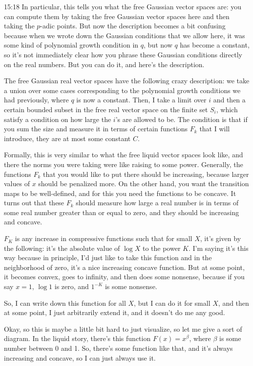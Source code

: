 \begin{unfinished}{15:18}
In particular, this tells you what the free Gaussian vector spaces are: you can compute them by taking the free Gaussian vector spaces here and then taking the
$p$-adic points. But now the description becomes a bit confusing because when we wrote down the Gaussian conditions that we allow here, it was some kind of polynomial growth condition in $q$, but now $q$ has become a constant, so it's not immediately clear how you phrase these Gaussian conditions directly on the real numbers. But you can do it, and here's the description.

The free Gaussian real vector spaces have the following crazy description: we take a union over some cases corresponding to the polynomial growth conditions we had previously, where $q$ is now a constant. Then, I take a limit over $i$ and then a certain bounded subset in the free real vector space on the finite set $S_i$, which satisfy a condition on how large the $i$'s are allowed to be. The condition is that if you sum the size and measure it in terms of certain functions $F_k$ that I will introduce, they are at most some constant $C$.

Formally, this is very similar to what the free liquid vector spaces look like, and there the norms you were taking were like raising to some power. Generally, the functions $F_k$ that you would like to put there should be increasing, because larger values of $x$ should be penalized more. On the other hand, you want the transition maps to be well-defined, and for this you need the functions to be concave. It turns out that these $F_k$ should measure how large a real number is in terms of some real number greater than or equal to zero, and they should be increasing and concave.


$F_K$ is any increase in compressive functions such that for small $X$, it's given by the following: it's the absolute value of $\log X$ to the power $K$. I'm saying it's this way because in principle, I'd just like to take this function and in the neighborhood of zero, it's a nice increasing concave function. But at some point, it becomes convex, goes to infinity, and then does some nonsense, because if you say $x = 1$, $\log 1$ is zero, and $1^{-K}$ is some nonsense. 

So, I can write down this function for all $X$, but I can do it for small $X$, and then at some point, I just arbitrarily extend it, and it doesn't do me any good.

Okay, so this is maybe a little bit hard to just visualize, so let me give a sort of diagram. In the liquid story, there's this function $F(x) = x^{\beta}$, where $\beta$ is some number between 0 and 1. So, there's some function like that, and it's always increasing and concave, so I can just always use it.


\end{unfinished}

